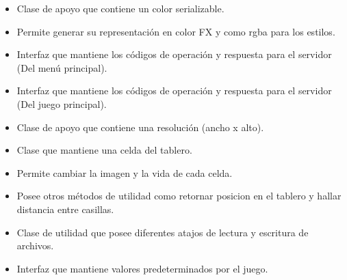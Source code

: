 \documentclass{article}
\begin{document}

\begin{itemize}
	\item Clase de apoyo que contiene un color serializable.
	\item Permite generar su representación en color FX y como rgba para los estilos.
\end{itemize}

\begin{itemize}
	\item Interfaz que mantiene los códigos de operación y respuesta para el servidor (Del menú principal).
\end{itemize}

\begin{itemize}
	\item Interfaz que mantiene los códigos de operación y respuesta para el servidor (Del juego principal).
\end{itemize}

\begin{itemize}
	\item Clase de apoyo que contiene una resolución (ancho x alto).
\end{itemize}

\begin{itemize}
	\item Clase que mantiene una celda del tablero.
	\item Permite cambiar la imagen y la vida de cada celda.
	\item Posee otros métodos de utilidad como retornar posicion en el tablero y hallar distancia entre casillas.
\end{itemize}

\begin{itemize}
	\item Clase de utilidad que posee diferentes atajos de lectura y escritura de archivos.
\end{itemize}

\begin{itemize}
	\item Interfaz que mantiene valores predeterminados por el juego.
\end{itemize}
\end{document}
